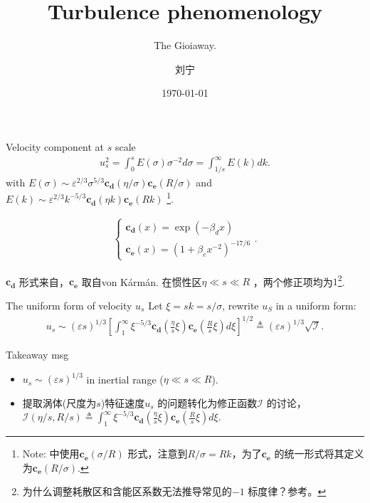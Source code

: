 \documentclass[10pt,xcolor={table,dvipsnames},t]{beamer}
\title{Turbulence phenomenology}
\subtitle{The Gioia\his way.}
\author{刘宁}
\institute{浙江大学}
\date{\today}
\begin{document}
\begin{frame}
  \titlepage
\end{frame}

\begin{frame}{Velocity component at $s$ scale}
    \begin{align*}
        u_s^2 = \int_0^s E(\sigma) \sigma^{-2} d\sigma = \int_{1 / s}^{\infty} E(k) dk
    .\end{align*}
    with $E(\sigma) \sim \varepsilon^{2 / 3} \sigma^{5 / 3} \mathbf{c_d} \left( \eta / \sigma \right) \mathbf{c_e} \left( R / \sigma \right)$ and $E(k) \sim \varepsilon^{2 / 3} k^{-5 / 3} \mathbf{c_d} (\eta k) \mathbf{c_e} \left( Rk \right) $ \footnote{Note: \citet{gioiaFriction2006}中使用$\mathbf{c_e} \left( \sigma / R \right) $ 形式，注意到$R / \sigma = Rk$，为了$\mathbf{c_e} $ 的统一形式将其定义为$\mathbf{c_e} \left( R / \sigma \right) $.}.

    \begin{align*}
        \begin{cases}
            \mathbf{c_d}\left( x \right)  = \exp\left( -\beta_d x \right) \\
            \mathbf{c_e} \left( x \right) = \left( 1+\beta_e x^{-2} \right) ^{-17 / 6} 
        \end{cases}
    .\end{align*}

    $\mathbf{c_d}$ 形式来自\citet{gioiaFriction2006}，$\mathbf{c_e}$ 取自von K\'arm\'an. 在惯性区$\eta \ll s \ll R$ ，两个修正项均为$1$\footnote{为什么调整耗散区和含能区系数无法推导常见的$-1$ 标度律？参考\cite{nikora1999prl}。}.
    
\end{frame}

\begin{frame}{The uniform form of velocity $u_s$}
    Let $\xi = sk = s / \sigma$, rewrite $u_S$ in a uniform form:
    \begin{align*}
        u_s \sim \left( \varepsilon s \right) ^{1 / 3} \left[ \int_1^{\infty} \xi^{-5 / 3} \mathbf{c_d}\left( \frac{\eta}{s} \xi \right) \mathbf{c_e} \left( \frac{R}{s} \xi \right) d\xi \right]^{1 / 2}  \triangleq \left( \varepsilon s \right) ^{1 / 3} \sqrt{\mathcal{I} } 
    .\end{align*}
    \begin{block}{Takeaway msg}
        \begin{itemize}
            \item $u_s \sim \left( \varepsilon s \right) ^{1 / 3} $ in inertial range ($\eta \ll s \ll R$).
            \item 提取涡体(尺度为$s$)特征速度$u_s$ 的问题转化为修正函数$\mathcal{I}$ 的讨论，$\mathcal{I}\left( \eta / s, R / s \right)  \triangleq \int_1^{\infty} \xi^{-5 / 3} \mathbf{c_d}\left( \frac{\eta}{s} \xi \right) \mathbf{c_e} \left( \frac{R}{s} \xi \right) d\xi$.
        \end{itemize}
    \end{block}
\end{frame}
\end{document}
